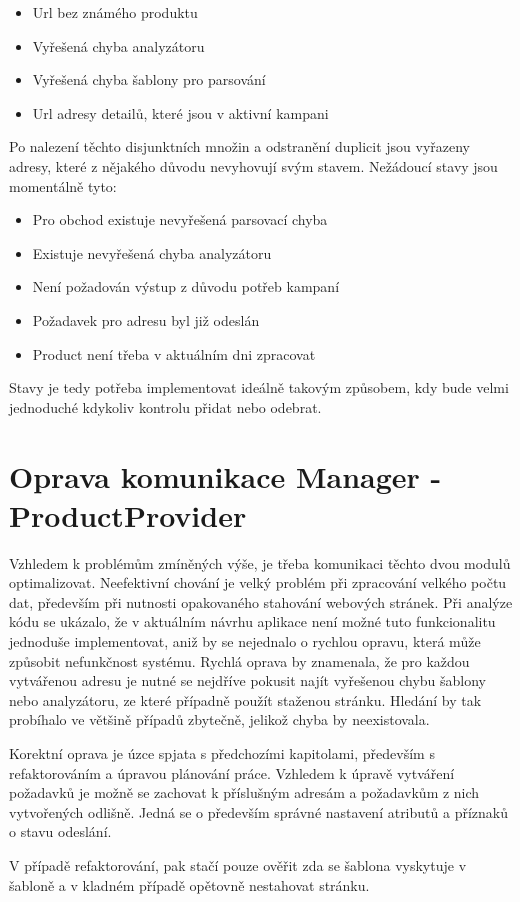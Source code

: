 \documentclass[thesis=B,czech]{FITthesis}[2012/06/26]
\begin{document}
\begin{itemize}
\item Url bez známého produktu
\item Vyřešená chyba analyzátoru
\item Vyřešená chyba šablony pro parsování
\item Url adresy detailů, které jsou v aktivní kampani
\end{itemize}

Po nalezení těchto disjunktních množin a odstranění duplicit jsou vyřazeny adresy, které z nějakého důvodu nevyhovují svým stavem.
Nežádoucí stavy jsou momentálně tyto:

\begin{itemize}
\item Pro obchod existuje nevyřešená parsovací chyba
\item Existuje nevyřešená chyba analyzátoru
\item Není požadován výstup z důvodu potřeb kampaní
\item Požadavek pro adresu byl již odeslán
\item Product není třeba v aktuálním dni zpracovat
\end{itemize}

Stavy je tedy potřeba implementovat ideálně takovým způsobem, kdy bude velmi jednoduché 
kdykoliv kontrolu přidat nebo odebrat.

\section{Oprava komunikace Manager - ProductProvider}
Vzhledem k problémům zmíněných výše, je třeba komunikaci těchto dvou modulů optimalizovat. Neefektivní chování je
velký problém při zpracování velkého počtu dat, především při nutnosti opakovaného stahování webových stránek. Při analýze kódu se ukázalo, že v aktuálním návrhu aplikace není možné tuto funkcionalitu jednoduše implementovat, aniž by se nejednalo o rychlou opravu, která může způsobit nefunkčnost systému. Rychlá oprava by znamenala, že pro každou vytvářenou adresu je nutné se nejdříve pokusit najít vyřešenou chybu šablony 
nebo analyzátoru, ze které případně použít staženou stránku. Hledání by tak probíhalo ve většině případů zbytečně, jelikož chyba by neexistovala.
\par
Korektní oprava je úzce spjata s předchozími kapitolami, především s refaktorováním a úpravou plánování práce. Vzhledem k úpravě vytváření
požadavků je možně se zachovat k příslušným adresám a požadavkům z nich vytvořených odlišně. Jedná se o především správné nastavení atributů
a příznaků o stavu odeslání.
\par
V případě refaktorování, pak stačí pouze ověřit zda se šablona vyskytuje v šabloně a v kladném případě opětovně nestahovat stránku.
\end{document}
